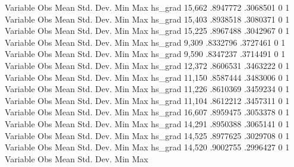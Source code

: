 {\smallskip}
    Variable {\VBAR}        Obs        Mean    Std. Dev.       Min        Max
     hs_grad {\VBAR}     15,662    .8947772    .3068501          0          1
{\smallskip}
    Variable {\VBAR}        Obs        Mean    Std. Dev.       Min        Max
     hs_grad {\VBAR}     15,403    .8938518    .3080371          0          1
{\smallskip}
    Variable {\VBAR}        Obs        Mean    Std. Dev.       Min        Max
     hs_grad {\VBAR}     15,225    .8967488    .3042967          0          1
{\smallskip}
    Variable {\VBAR}        Obs        Mean    Std. Dev.       Min        Max
     hs_grad {\VBAR}      9,309    .8332796    .3727461          0          1
{\smallskip}
    Variable {\VBAR}        Obs        Mean    Std. Dev.       Min        Max
     hs_grad {\VBAR}      9,590    .8347237    .3714491          0          1
{\smallskip}
    Variable {\VBAR}        Obs        Mean    Std. Dev.       Min        Max
     hs_grad {\VBAR}     12,372    .8606531    .3463222          0          1
{\smallskip}
    Variable {\VBAR}        Obs        Mean    Std. Dev.       Min        Max
     hs_grad {\VBAR}     11,150    .8587444    .3483006          0          1
{\smallskip}
    Variable {\VBAR}        Obs        Mean    Std. Dev.       Min        Max
     hs_grad {\VBAR}     11,226    .8610369    .3459234          0          1
{\smallskip}
    Variable {\VBAR}        Obs        Mean    Std. Dev.       Min        Max
     hs_grad {\VBAR}     11,104    .8612212    .3457311          0          1
{\smallskip}
    Variable {\VBAR}        Obs        Mean    Std. Dev.       Min        Max
     hs_grad {\VBAR}     16,607    .8959475    .3053378          0          1
{\smallskip}
    Variable {\VBAR}        Obs        Mean    Std. Dev.       Min        Max
     hs_grad {\VBAR}     14,291    .8950388    .3065141          0          1
{\smallskip}
    Variable {\VBAR}        Obs        Mean    Std. Dev.       Min        Max
     hs_grad {\VBAR}     14,525    .8977625    .3029708          0          1
{\smallskip}
    Variable {\VBAR}        Obs        Mean    Std. Dev.       Min        Max
     hs_grad {\VBAR}     14,520    .9002755    .2996427          0          1
{\smallskip}
    Variable {\VBAR}        Obs        Mean    Std. Dev.       Min        Max
